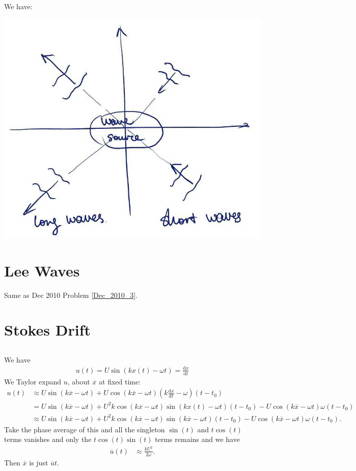 \documentclass[11pt,letterpaper]{book}
\theoremstyle{definition}
\newcommand{\de}{\mathrm{d}}
\begin{document}
\subsection{}
We have:
\begin{center}
    \includegraphics[scale=0.3]{Fig/Rossby_Quadrent}
\end{center}

\section{Lee Waves}
Same as Dec 2010 Problem \ref{Dec_2010_3}.

\section{Stokes Drift}
\subsection{}
We have
\begin{align*}
    u(t) = U\sin(kx(t)-\omega t) = \frac{\de x}{\de t}
\end{align*}
We Taylor expand $u$, about $\overline{x}$ at fixed time:
\begin{align*}
    u(t) &\approx U\sin(k\overline{x}-\omega t)+U\cos(k\overline{x}-\omega t)\left(k\frac{\de x}{\de t}-\omega\right)(t-t_0)\\
    &= U\sin(k\overline{x}-\omega t)+U^2 k\cos(k\overline{x}-\omega t)\sin(kx(t)-\omega t)(t-t_0)-U\cos(k\overline{x}-\omega t)\omega(t-t_0)\\
    &\approx U\sin(k\overline{x}-\omega t)+U^2 k\cos(k\overline{x}-\omega t)\sin(k\overline{x}-\omega t)(t-t_0)-U\cos(k\overline{x}-\omega t)\omega(t-t_0).
\end{align*}
Take the phase average of this and all the singleton $\sin(t)$ and $t\cos(t)$ terms vanishes and only the $t\cos(t)\sin(t)$ terms remains and we have
\begin{align*}
    \overline{u}(t) &\approx \frac{k U^2}{2\omega}.
\end{align*}
Then $\overline{x}$ is just $\overline{u}t$. 
\end{document}
